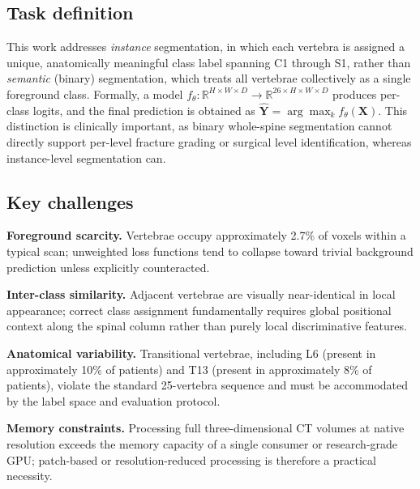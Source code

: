 \documentclass[preprint,12pt,3p]{elsarticle}
\begin{document}
\subsection{Task definition}
This work addresses \emph{instance} segmentation, in which each vertebra is assigned a unique, anatomically meaningful class label spanning C1 through S1, rather than \emph{semantic} (binary) segmentation, which treats all vertebrae collectively as a single foreground class. Formally, a model $f_\theta : \mathbb{R}^{H \times W \times D} \rightarrow \mathbb{R}^{26 \times H \times W \times D}$ produces per-class logits, and the final prediction is obtained as $\hat{\mathbf{Y}} = \arg\max_k f_\theta(\mathbf{X})$. This distinction is clinically important, as binary whole-spine segmentation cannot directly support per-level fracture grading or surgical level identification, whereas instance-level segmentation can.

\subsection{Key challenges}
\textbf{Foreground scarcity.} Vertebrae occupy approximately 2.7\% of voxels within a typical scan; unweighted loss functions tend to collapse toward trivial background prediction unless explicitly counteracted.

\textbf{Inter-class similarity.} Adjacent vertebrae are visually near-identical in local appearance; correct class assignment fundamentally requires global positional context along the spinal column rather than purely local discriminative features.

\textbf{Anatomical variability.} Transitional vertebrae, including L6 (present in approximately 10\% of patients) and T13 (present in approximately 8\% of patients), violate the standard 25-vertebra sequence and must be accommodated by the label space and evaluation protocol.

\textbf{Memory constraints.} Processing full three-dimensional CT volumes at native resolution exceeds the memory capacity of a single consumer or research-grade GPU; patch-based or resolution-reduced processing is therefore a practical necessity.
\end{document}
